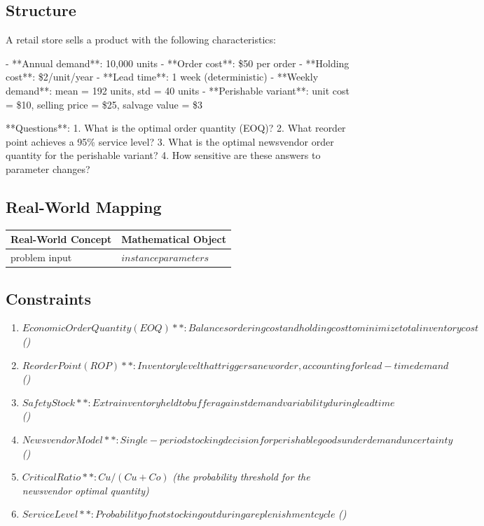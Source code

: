 \documentclass[11pt, a4paper]{article}
\begin{document}
\subsection{Structure}

A retail store sells a product with the following characteristics:

- **Annual demand**: 10,000 units
- **Order cost**: \$50 per order
- **Holding cost**: \$2/unit/year
- **Lead time**: 1 week (deterministic)
- **Weekly demand**: mean = 192 units, std = 40 units
- **Perishable variant**: unit cost = \$10, selling price = \$25, salvage value = \$3

**Questions**:
1. What is the optimal order quantity (EOQ)?
2. What reorder point achieves a 95\% service level?
3. What is the optimal newsvendor order quantity for the perishable variant?
4. How sensitive are these answers to parameter changes?

\subsection{Real-World Mapping}

\begin{longtable}{ll}
\toprule
\textbf{Real-World Concept} & \textbf{Mathematical Object} \\
\midrule
\endhead
problem input & $instance parameters$ \\
\bottomrule
\end{longtable}

\subsection{Constraints}

\begin{enumerate}
  \item $Economic Order Quantity (EOQ)**: Balances ordering cost and holding cost to minimize total inventory cost$
  \hfill \textit{()}
  \item $Reorder Point (ROP)**: Inventory level that triggers a new order, accounting for lead-time demand$
  \hfill \textit{()}
  \item $Safety Stock**: Extra inventory held to buffer against demand variability during lead time$
  \hfill \textit{()}
  \item $Newsvendor Model**: Single-period stocking decision for perishable goods under demand uncertainty$
  \hfill \textit{()}
  \item $Critical Ratio**: Cu / (Cu + Co)$
  \hfill \textit{(the probability threshold for the newsvendor optimal quantity)}
  \item $Service Level**: Probability of not stocking out during a replenishment cycle$
  \hfill \textit{()}
\end{enumerate}
\end{document}

